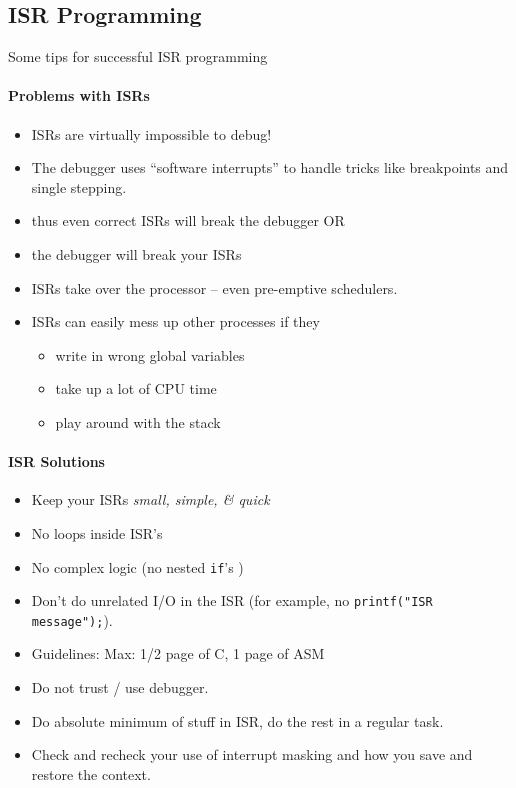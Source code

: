 \subsection{ISR Programming}

 Some tips for successful ISR programming	%

\paragraph{Problems with ISRs}
\begin{itemize}
        \item ISRs are virtually impossible to debug!
        \item The debugger uses ``software interrupts'' to handle
        tricks like breakpoints and single stepping.
        \item thus even correct ISRs will break the debugger OR
        \item the debugger will break your ISRs
        \item ISRs take over the processor -- even pre-emptive
        schedulers.
        \item ISRs can easily mess up other processes if they

                \begin{itemize}
                \item write in wrong global variables
                \item take up a lot of CPU time
                \item play around with the stack
                \end{itemize}
\end{itemize}



\paragraph{ISR Solutions}


\begin{itemize}
        \item Keep your ISRs  {\it small, simple, \& quick }
        \item No loops inside ISR's
        \item No complex logic (no nested {\tt if}'s )
        \item Don't do unrelated I/O in the ISR (for example,
        no {\tt printf("ISR message");}).
        \item Guidelines: Max: 1/2 page of C, 1 page of ASM
        \item Do not trust / use debugger.
        \item Do absolute minimum of stuff in ISR, do the
        rest in a regular task.
        \item Check and recheck your use of interrupt masking
        and how you save and restore the context.

\end{itemize}


